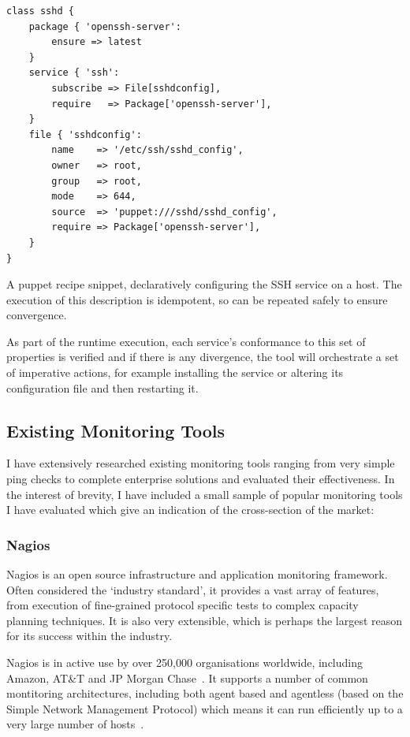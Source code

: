 \documentclass{cshonours}
\begin{document}
\begin{listing}[h]
\begin{verbatim}
class sshd {
    package { 'openssh-server':
        ensure => latest
    }
    service { 'ssh':
        subscribe => File[sshdconfig],
        require   => Package['openssh-server'],
    }
    file { 'sshdconfig': 
        name    => '/etc/ssh/sshd_config',
        owner   => root,
        group   => root,
        mode    => 644,
        source  => 'puppet:///sshd/sshd_config',
        require => Package['openssh-server'],
    }
}
\end{verbatim}
\caption{A puppet recipe snippet, declaratively configuring the SSH service on a host. The execution of this description is idempotent, so can be repeated safely to ensure convergence.}
\label{fig:PuppetDSLSnippet}
\end{listing}

As part of the runtime execution, each service’s conformance to this set of properties is verified and if there is any divergence, the tool will orchestrate a set of imperative actions, for example installing the service or altering its configuration file and then restarting it.

\clearpage
\subsection{Existing Monitoring Tools}

I have extensively researched existing monitoring tools ranging from very simple ping checks to complete enterprise solutions and evaluated their effectiveness. In the interest of brevity, I have included a small sample of popular monitoring tools I have evaluated which give an indication of the cross-section of the market:

\subsubsection{Nagios}

Nagios is an open source infrastructure and application monitoring framework. Often considered the `industry standard', it provides a vast array of features, from execution of fine-grained protocol specific tests to complex capacity planning techniques. It is also very extensible, which is perhaps the largest reason for its success within the industry.

Nagios is in active use by over 250,000 organisations worldwide, including Amazon, AT\&T and JP Morgan Chase~\cite{NagiosUsage}. It supports a number of common montitoring architectures, including both agent based and agentless (based on the Simple Network Management Protocol) which means it can run efficiently up to a very large number of hosts~\cite{NagiosArchitectures}.
\end{document}
